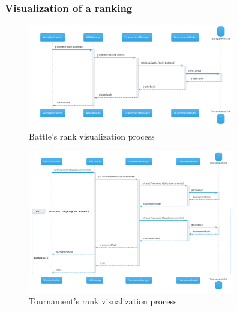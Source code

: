 \newpage
\subsubsection{Visualization of a ranking}
\begin{figure}[H]
    \hspace{1cm}
    \includegraphics[width=0.8\textwidth]{Diagrams/sequence/visualize_battle_rank.png}
    \caption{Battle's rank visualization process}
\end{figure}
\begin{figure}[H]
    \hspace{1.2cm}
    \includegraphics[width=0.8\textwidth]{Diagrams/sequence/visualize_tournament_rank.png}
    \caption{Tournament's rank visualization process}
\end{figure}

